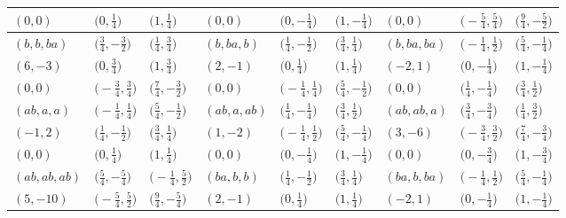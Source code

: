 \documentclass[10pt,a4paper]{amsart}
\theoremstyle{definition}
\numberwithin{equation}{section}
\begin{document}
\begin{landscape}
\begin{table}[th]
\begin{tabular}{|lll|lll|lll|}
\\
$(0, 0)$ & $\bigl(0, \frac{1}{4}\bigr)$ & $\bigl(1, \frac{1}{4}\bigr)$ & $(0, 0)$ & $\bigl(0, -\frac{1}{4}\bigr)$ & $\bigl(1, -\frac{1}{4}\bigr)$ & $(0, 0)$ & $\bigl(-\frac{5}{4}, \frac{5}{4}\bigr)$ & $\bigl(\frac{9}{4}, -\frac{5}{2}\bigr)$
\\\hline
$(b, b, ba)$ & $\bigl(\frac{3}{4}, -\frac{3}{2}\bigr)$ & $\bigl(\frac{1}{4}, \frac{3}{4}\bigr)$ & $(b, ba, b)$ & $\bigl(\frac{1}{4}, -\frac{1}{2}\bigr)$ & $\bigl(\frac{3}{4}, \frac{1}{4}\bigr)$ & $(b, ba, ba)$ & $\bigl(-\frac{1}{4}, \frac{1}{2}\bigr)$ & $\bigl(\frac{5}{4}, -\frac{1}{4}\bigr)$
\\
$(6, -3)$ & $\bigl(0, \frac{3}{4}\bigr)$ & $\bigl(1, \frac{3}{4}\bigr)$ & $(2, -1)$ & $\bigl(0, \frac{1}{4}\bigr)$ & $\bigl(1, \frac{1}{4}\bigr)$ & $(-2, 1)$ & $\bigl(0, -\frac{1}{4}\bigr)$ & $\bigl(1, -\frac{1}{4}\bigr)$
\\
$(0, 0)$ & $\bigl(-\frac{3}{4}, \frac{3}{4}\bigr)$ & $\bigl(\frac{7}{4}, -\frac{3}{2}\bigr)$ & $(0, 0)$ & $\bigl(-\frac{1}{4}, \frac{1}{4}\bigr)$ & $\bigl(\frac{5}{4}, -\frac{1}{2}\bigr)$ & $(0, 0)$ & $\bigl(\frac{1}{4}, -\frac{1}{4}\bigr)$ & $\bigl(\frac{3}{4}, \frac{1}{2}\bigr)$
\\\hline
$(ab, a, a)$ & $\bigl(-\frac{1}{4}, \frac{1}{4}\bigr)$ & $\bigl(\frac{5}{4}, -\frac{1}{2}\bigr)$ & $(ab, a, ab)$ & $\bigl(\frac{1}{4}, -\frac{1}{4}\bigr)$ & $\bigl(\frac{3}{4}, \frac{1}{2}\bigr)$ & $(ab, ab, a)$ & $\bigl(\frac{3}{4}, -\frac{3}{4}\bigr)$ & $\bigl(\frac{1}{4}, \frac{3}{2}\bigr)$
\\
$(-1, 2)$ & $\bigl(\frac{1}{4}, -\frac{1}{2}\bigr)$ & $\bigl(\frac{3}{4}, \frac{1}{4}\bigr)$ & $(1, -2)$ & $\bigl(-\frac{1}{4}, \frac{1}{2}\bigr)$ & $\bigl(\frac{5}{4}, -\frac{1}{4}\bigr)$ & $(3, -6)$ & $\bigl(-\frac{3}{4}, \frac{3}{2}\bigr)$ & $\bigl(\frac{7}{4}, -\frac{3}{4}\bigr)$
\\
$(0, 0)$ & $\bigl(0, \frac{1}{4}\bigr)$ & $\bigl(1, \frac{1}{4}\bigr)$ & $(0, 0)$ & $\bigl(0, -\frac{1}{4}\bigr)$ & $\bigl(1, -\frac{1}{4}\bigr)$ & $(0, 0)$ & $\bigl(0, -\frac{3}{4}\bigr)$ & $\bigl(1, -\frac{3}{4}\bigr)$
\\\hline
$(ab, ab, ab)$ & $\bigl(\frac{5}{4}, -\frac{5}{4}\bigr)$ & $\bigl(-\frac{1}{4}, \frac{5}{2}\bigr)$ & $(ba, b, b)$ & $\bigl(\frac{1}{4}, -\frac{1}{2}\bigr)$ & $\bigl(\frac{3}{4}, \frac{1}{4}\bigr)$ & $(ba, b, ba)$ & $\bigl(-\frac{1}{4}, \frac{1}{2}\bigr)$ & $\bigl(\frac{5}{4}, -\frac{1}{4}\bigr)$
\\
$(5, -10)$ & $\bigl(-\frac{5}{4}, \frac{5}{2}\bigr)$ & $\bigl(\frac{9}{4}, -\frac{5}{4}\bigr)$ & $(2, -1)$ & $\bigl(0, \frac{1}{4}\bigr)$ & $\bigl(1, \frac{1}{4}\bigr)$ & $(-2, 1)$ & $\bigl(0, -\frac{1}{4}\bigr)$ & $\bigl(1, -\frac{1}{4}\bigr)$

\end{tabular}
\end{table}
\end{landscape}
\end{document}
